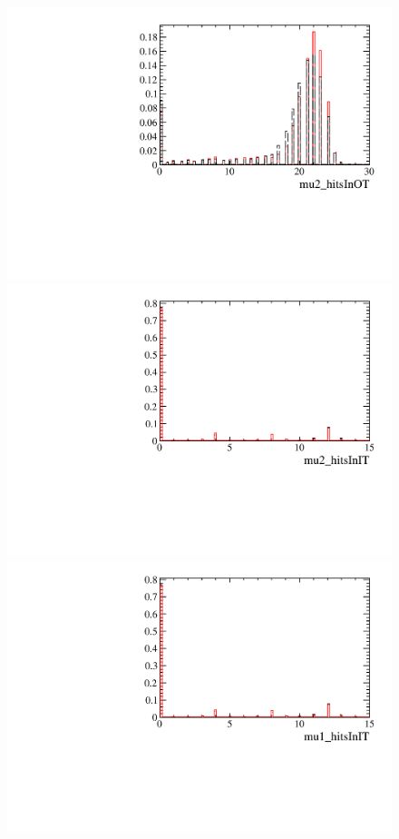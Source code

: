 \begin{figure} [htb!]
\begin{center}
\includegraphics[scale=0.20]{figs/mu2_hitsInOTPARTIAL.pdf}
\includegraphics[scale=0.20]{figs/mu2_hitsInITPARTIAL.pdf}
\includegraphics[scale=0.20]{figs/mu1_hitsInITPARTIAL.pdf}

\end{center}
\end{figure}
